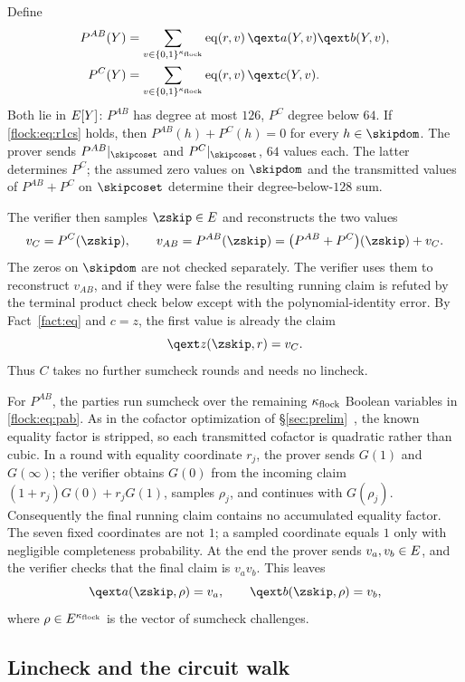 Define
\begin{align}
P^{AB}(Y)&=\sum_{v\in\cube{\nflock}}\eq(r,v)\,\qext a(Y,v)\qext b(Y,v),\label{flock:eq:pab}\\
P^C(Y)&=\sum_{v\in\cube{\nflock}}\eq(r,v)\,\qext c(Y,v).\label{flock:eq:pc}
\end{align}
Both lie in $E[Y]$: $P^{AB}$ has degree at most $126$, $P^C$ degree below $64$. If \eqref{flock:eq:r1cs} holds, then $P^{AB}(h)+P^C(h)=0$ for every $h\in\skipdom$. The prover sends $P^{AB}|_{\skipcoset}$ and $P^C|_{\skipcoset}$, $64$ values each. The latter determines $P^C$; the assumed zero values on $\skipdom$ and the transmitted values of $P^{AB}+P^C$ on $\skipcoset$ determine their degree-below-$128$ sum.

The verifier then samples $\zskip\in\E$ and reconstructs the two values
\[
v_C=P^C(\zskip),\qquad v_{AB}=P^{AB}(\zskip)=\bigl(P^{AB}+P^C\bigr)(\zskip)+v_C.
\]
The zeros on $\skipdom$ are not checked separately. The verifier uses them to reconstruct $v_{AB}$, and if they were false the resulting running claim is refuted by the terminal product check below except with the polynomial-identity error. By Fact~\ref{fact:eq} and $c=z$, the first value is already the claim
\begin{equation}\label{flock:eq:c-claim}
\qext z(\zskip,r)=v_C.
\end{equation}
Thus $C$ takes no further sumcheck rounds and needs no lincheck.

For $P^{AB}$, the parties run sumcheck over the remaining $\kappa_{\mathrm{flock}}$ Boolean variables in \eqref{flock:eq:pab}. As in the cofactor optimization of \S\ref{sec:prelim}~\cite{Gru24}, the known equality factor is stripped, so each transmitted cofactor is quadratic rather than cubic. In a round with equality coordinate $r_j$, the prover sends $G(1)$ and $G(\infty)$; the verifier obtains $G(0)$ from the incoming claim $(1+r_j)G(0)+r_jG(1)$, samples $\rho_j$, and continues with $G(\rho_j)$. Consequently the final running claim contains no accumulated equality factor. The seven fixed coordinates are not $1$; a sampled coordinate equals $1$ only with negligible completeness probability. At the end the prover sends $v_a,v_b\in E$, and the verifier checks that the final claim is $v_av_b$. This leaves
\[
\qext a(\zskip,\rho)=v_a,\qquad \qext b(\zskip,\rho)=v_b,
\]
where $\rho\in E^{\kappa_{\mathrm{flock}}}$ is the vector of sumcheck challenges.

\subsection{Lincheck and the circuit walk}\label{flock:lincheck}

